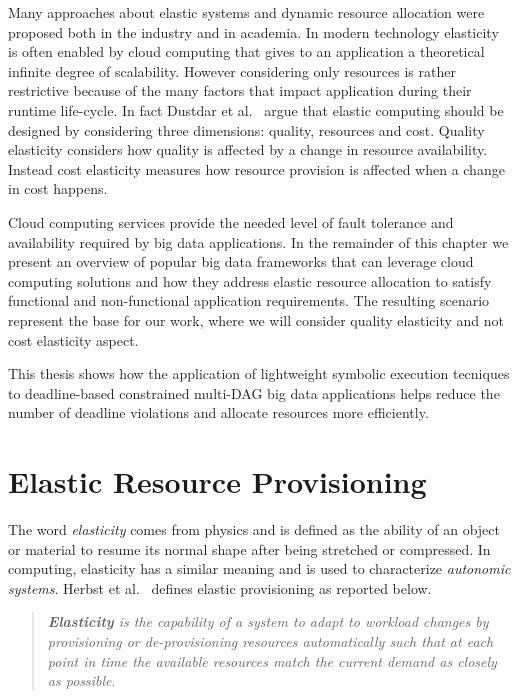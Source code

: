Many approaches about elastic systems and dynamic resource allocation were proposed both in the industry and in academia. In modern technology elasticity is often enabled by cloud computing that gives to an application a theoretical infinite degree of scalability. However considering only resources is rather restrictive because of the many factors that impact application during their runtime life-cycle. In fact Dustdar et al.~\cite{Dustdar2011} argue that elastic computing should be designed by considering three dimensions: quality, resources and cost.  Quality elasticity considers how quality is affected by a change in resource availability. Instead cost elasticity measures how resource provision is affected when a change in cost happens. 

Cloud computing services provide the needed level of fault tolerance and availability required by big data applications. In the remainder of this chapter we present an overview of popular big data frameworks that can leverage cloud computing solutions and how they address elastic resource allocation to satisfy functional and non-functional application requirements. The resulting scenario represent the base for our work, where we will consider quality elasticity and not cost elasticity aspect. 

This thesis shows how the application of lightweight symbolic execution tecniques to deadline-based \qos constrained multi-DAG big data applications helps reduce the number of deadline violations and allocate resources more efficiently.


\section{Elastic Resource Provisioning}
\label{Section:Introduction:ElasticProvisioning}

The word \textit{elasticity} comes from physics and is defined as the ability of an object or material to resume its normal shape after being stretched or compressed. In computing, elasticity has a similar meaning and is used to characterize \textit{autonomic systems}. Herbst et al.~\cite{Herbst2013} defines elastic provisioning as reported below.
\begin{quote}
	\textit{\textbf{Elasticity} is the capability of a system to adapt to workload changes by provisioning or de-provisioning resources automatically such that at each point in time the available resources match the current demand as closely as possible}.
\end{quote}

